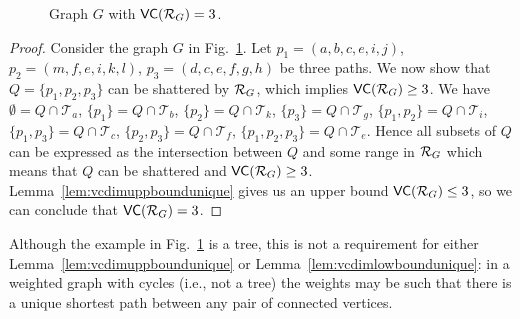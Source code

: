 \ifproof
\begin{figure}[ht]
  \centering
  \caption{Graph $G$ with $\mathsf{VC}(\mathcal{R}_G)= 3$.}
  \label{fig:uniquetight}
\end{figure}

\begin{proof}
  Consider the graph $G$ in Fig.~\ref{fig:uniquetight}.
  Let $p_1=(a,b,c,e,i,j)$, $p_2=(m,f,e,i,k,l)$, $p_3=(d,c,e,f,g,h)$ be three
  paths. We now show that $Q=\{p_1,p_2,p_3\}$ can be shattered by $\mathcal{R}_G$, which
  implies $\mathsf{VC}(\mathcal{R}_G)\ge 3$. We have $\emptyset=Q\cap\mathcal{T}_a$,
  $\{p_1\}=Q\cap\mathcal{T}_b$, $\{p_2\}=Q\cap\mathcal{T}_k$,
  $\{p_3\}=Q\cap\mathcal{T}_g$, $\{p_1,p_2\}=Q\cap\mathcal{T}_i$,
  $\{p_1,p_3\}=Q\cap\mathcal{T}_c$, $\{p_2,p_3\}=Q\cap\mathcal{T}_f$,
  $\{p_1,p_2,p_3\}=Q\cap\mathcal{T}_e$.  
  Hence all subsets of $Q$ can be expressed as the intersection between $Q$ and
  some range in $\mathcal{R}_G$ which means that $Q$ can be shattered and
  $\mathsf{VC}(\mathcal{R}_G)\ge 3$. Lemma~\ref{lem:vcdimuppboundunique} gives us an upper
  bound $\mathsf{VC}(\mathcal{R}_G)\le3$, so we can conclude that $\mathsf{VC}(\mathcal{R}_G)=3$.
\end{proof}

Although the example in Fig.~\ref{fig:uniquetight} is a tree, this is not a
requirement for either Lemma~\ref{lem:vcdimuppboundunique} or
Lemma~\ref{lem:vcdimlowboundunique}: in a weighted graph with cycles (i.e., not
a tree) the weights may be such that there is a unique shortest path between any
pair of connected vertices.
\fi

